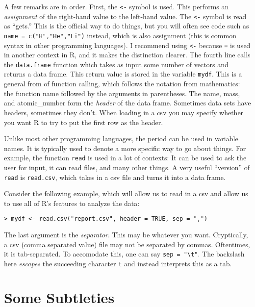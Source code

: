 \documentclass[12pt]{article}
\begin{document}
A few remarks are in order. First, the \verb|<-| symbol is used. This performs an \emph{assignment} of the right-hand value to the left-hand value. The \verb|<-| symbol is read as ``gets.'' This is the official way to do things, but you will often see code such as \verb|name = c("H","He","Li")| instead, which is also assignment (this is common syntax in other programming languages). I recommend using \verb|<-| because \verb|=| is used in another context in R, and it makes the distinction clearer. The fourth line calls the \verb|data.frame| function which takes as input some number of vectors and returns a data frame. This return value is stored in the variable \verb|mydf|. This is a general from of function calling, which follows the notation from mathematics: the function name followed by the arguments in parentheses. The name, mass, and atomic\_number form the \emph{header} of the data frame. Sometimes data sets have headers, sometimes they don't. When loading in a csv you may specify whether you want R to try to put the first row as the header.

Unlike most other programming languages, the period can be used in variable names. It is typically used to denote a more specific way to go about things. For example, the function \verb|read| is used in a lot of contexts: It can be used to ask the user for input, it can read files, and many other things. A very useful ``version'' of \verb|read| is \verb|read.csv|, which takes in a csv file and turns it into a data frame.

Consider the following example, which will allow us to read in a csv and allow us to use all of R's features to analyze the data:

\begin{verbatim}
> mydf <- read.csv("report.csv", header = TRUE, sep = ",")
\end{verbatim}

The last argument is the \emph{separator}. This may be whatever you want. Cryptically, a csv (comma separated value) file may not be separated by commas. Oftentimes, it is tab-separated. To accomodate this, one can say \verb|sep = "\t"|. The backslash here \emph{escapes} the succeeding character \verb|t| and instead interprets this as a tab.

\section{Some Subtleties}
\end{document}
